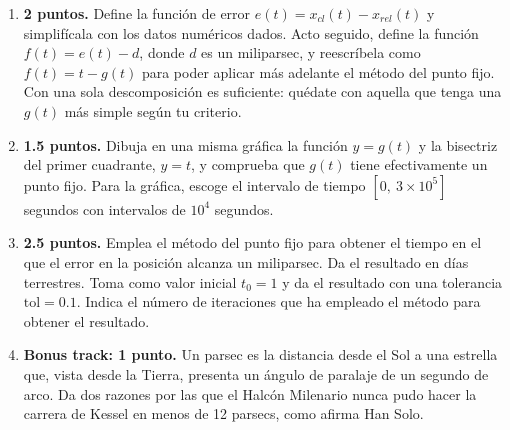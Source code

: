 \begin{enumerate}
\begin{enumerate}
	\item \textbf{2 puntos.} Define la función de error $e(t) = x_{cl}(t) - x_{rel}(t)$ y simplifícala con los datos numéricos dados. Acto seguido, define la función $f(t) = e(t) - d$, donde $d$ es un miliparsec, y reescríbela como $f(t) = t - g(t)$ para poder aplicar más adelante el método del punto fijo. Con una sola descomposición es suficiente: quédate con aquella que tenga una $g(t)$ más simple según tu criterio.

	\item \textbf{1.5 puntos.} Dibuja en una misma gráfica la función $y = g(t)$ y la bisectriz del primer cuadrante, $y = t$, y comprueba que $g(t)$ tiene efectivamente un punto fijo. Para la gráfica, escoge el intervalo de tiempo $[0,\ 3 \times 10^5]$ segundos con intervalos de $10^4$ segundos.
	\item \textbf{2.5 puntos.} Emplea el método del punto fijo para obtener el tiempo en el que el error en la posición alcanza un miliparsec. Da el resultado en días terrestres. Toma como valor inicial $t_0 = 1$ y da el resultado con una tolerancia $\text{tol} = 0.1$. Indica el número de iteraciones que ha empleado el método para obtener el resultado.
	\item \textbf{Bonus track: 1 punto.} Un parsec es la distancia desde el Sol a una estrella que, vista desde la Tierra, presenta un ángulo de paralaje de un segundo de arco. Da dos razones por las que el Halcón Milenario nunca pudo hacer la carrera de Kessel en menos de 12 parsecs, como afirma Han Solo.

\end{enumerate}
\end{enumerate}

